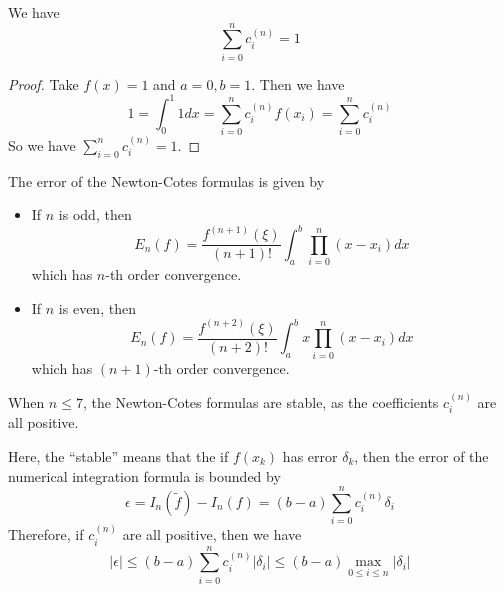 \documentclass{matharticle}
\begin{document}
We have
\begin{equation}
	\sum_{i=0}^{n} c_i^{(n)} = 1
\end{equation}
\begin{proof}
	Take $f(x) = 1$ and $a=0,b=1$. Then we have
	\begin{equation*}
		1 = \int_{0}^{1} 1 dx = \sum_{i=0}^{n} c_i^{(n)} f(x_i) = \sum_{i=0}^{n} c_i^{(n)}
	\end{equation*}
	So we have $\sum_{i=0}^{n} c_i^{(n)} = 1$.
\end{proof}

The error of the Newton-Cotes formulas is given by
\begin{itemize}
	\item If $n$ is odd, then
	      \begin{equation}
		      E_n(f) = \frac{f^{(n+1)}(\xi)}{(n+1)!} \int_{a}^{b} \prod_{i=0}^{n} (x - x_i) dx
	      \end{equation}
	      which has $n$-th order convergence.
	\item If $n$ is even, then
	      \begin{equation}
		      E_n(f) = \frac{f^{(n+2)}(\xi)}{(n+2)!} \int_{a}^{b} x \prod_{i=0}^{n} (x - x_i) dx
	      \end{equation}
	      which has $(n+1)$-th order convergence.
\end{itemize}

\begin{theorem}
	When $n\leq 7$, the Newton-Cotes formulas are stable, as the coefficients $c_i^{(n)}$ are all positive.
\end{theorem}

\begin{remark}
	Here, the ``stable'' means that the if $f(x_k)$ has error $\delta_k$, then the error of the numerical integration formula is bounded by
	\begin{equation*}
		\epsilon = I_n(\tilde{f}) - I_n(f) = (b-a) \sum_{i=0}^{n} c_i^{(n)} \delta_i
	\end{equation*}
	Therefore, if $c_i^{(n)}$ are all positive, then we have
	\begin{equation}
		|\epsilon| \leq (b-a) \sum_{i=0}^{n} c_i^{(n)} |\delta_i| \leq (b-a) \max_{0 \leq i \leq n} |\delta_i|
	\end{equation}
\end{remark}
\end{document}
